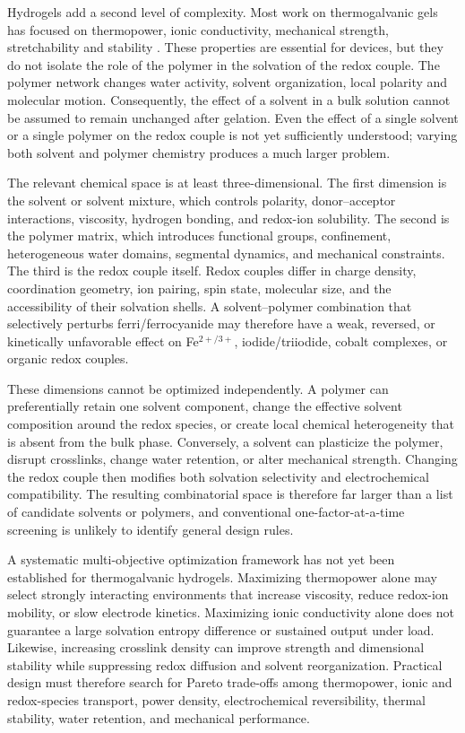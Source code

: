 Hydrogels add a second level of complexity. Most work on thermogalvanic gels
has focused on thermopower, ionic conductivity, mechanical strength,
stretchability and stability \citep{yang2023strong,gao2022anisotropic}.
These properties are essential for devices, but they do not isolate the role of
the polymer in the solvation of the redox couple. The polymer network changes
water activity, solvent organization, local polarity and molecular motion.
Consequently, the effect of a solvent in a bulk solution cannot be assumed to
remain unchanged after gelation. Even the effect of a single solvent or a
single polymer on the redox couple is not yet sufficiently understood; varying
both solvent and polymer chemistry produces a much larger problem.

The relevant chemical space is at least three-dimensional. The first dimension
is the solvent or solvent mixture, which controls polarity, donor--acceptor
interactions, viscosity, hydrogen bonding, and redox-ion solubility. The second
is the polymer matrix, which introduces functional groups, confinement,
heterogeneous water domains, segmental dynamics, and mechanical constraints.
The third is the redox couple itself. Redox couples differ in charge density,
coordination geometry, ion pairing, spin state, molecular size, and the
accessibility of their solvation shells. A solvent--polymer combination that
selectively perturbs ferri/ferrocyanide may therefore have a weak, reversed, or
kinetically unfavorable effect on Fe$^{2+/3+}$, iodide/triiodide, cobalt
complexes, or organic redox couples.

These dimensions cannot be optimized independently. A polymer can preferentially
retain one solvent component, change the effective solvent composition around
the redox species, or create local chemical heterogeneity that is absent from
the bulk phase. Conversely, a solvent can plasticize the polymer, disrupt
crosslinks, change water retention, or alter mechanical strength. Changing the
redox couple then modifies both solvation selectivity and electrochemical
compatibility. The resulting combinatorial space is therefore far larger than
a list of candidate solvents or polymers, and conventional one-factor-at-a-time
screening is unlikely to identify general design rules.

A systematic multi-objective optimization framework has not yet been
established for thermogalvanic hydrogels. Maximizing thermopower alone may
select strongly interacting environments that increase viscosity, reduce
redox-ion mobility, or slow electrode kinetics. Maximizing ionic conductivity
alone does not guarantee a large solvation entropy difference or sustained
output under load. Likewise, increasing crosslink density can improve strength
and dimensional stability while suppressing redox diffusion and solvent
reorganization. Practical design must therefore search for Pareto trade-offs
among thermopower, ionic and redox-species transport, power density,
electrochemical reversibility, thermal stability, water retention, and
mechanical performance.

